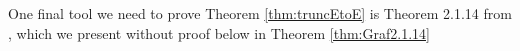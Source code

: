 \documentclass[../dissertation.tex]{subfiles}
\begin{document}


One final tool we need to prove Theorem \ref{thm:truncEtoE} is Theorem 2.1.14 from 
\cite{Grafakos}, which we present without proof below in Theorem \ref{thm:Graf2.1.14}
\end{document}
